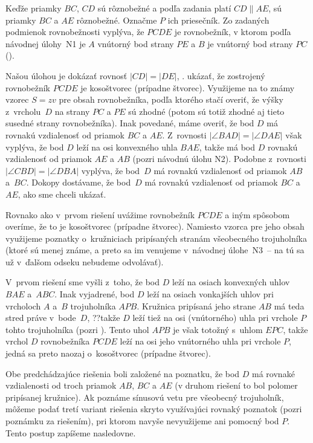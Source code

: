 {%
Keďže priamky $BC$, $CD$ sú rôznobežné a podľa zadania platí
$CD \parallel AE$, sú priamky $BC$ a $AE$ rôznobežné. Označme $P$
ich priesečník. Zo zadaných podmienok rovnobežnosti vyplýva, že
$PCDE$ je rovnobežník, v ktorom podľa návodnej úlohy~N1 je $A$
vnútorný bod strany $PE$ a $B$ je vnútorný bod strany $PC$ (\obr).
%

Našou úlohou je dokázať rovnosť $|CD|=|DE|$, \tj. ukázať, že
zostrojený rovnobežník $PCDE$ je kosoštvorec (prípadne štvorec).
Využijeme na to známy vzorec $S=zv$ pre obsah rovnobežníka,
podľa ktorého stačí overiť, že výšky z~vrcholu~$D$ na strany $PC$
a $PE$ sú zhodné (potom sú totiž zhodné aj tieto susedné
strany rovnobežníka). Inak povedané, máme overiť, že bod $D$ má
rovnakú vzdialenosť od priamok $BC$ a $AE$. Z~rovnosti
$|\angle BAD|=|\angle DAE|$ však vyplýva, že bod $D$ leží na osi
konvexného uhla $BAE$, takže má bod $D$ rovnakú vzdialenosť od priamok
$AE$ a $AB$ (pozri návodnú úlohu N2). Podobne z~rovnosti
$|\angle CBD|=|\angle DBA|$ vyplýva, že bod~$D$ má rovnakú
vzdialenosť od priamok $AB$ a~$BC$. Dokopy dostávame, že
bod~$D$ má rovnakú vzdialenosť od priamok $BC$ a $AE$, ako sme
chceli ukázať.

\ineriesenie
Rovnako ako v~prvom riešení uvážime rovnobežník $PCDE$ a iným
spôsobom overíme, že to je kosoštvorec (prípadne štvorec). Namiesto
vzorca pre jeho obsah využijeme poznatky
o~kružniciach pripísaných stranám všeobecného trojuholníka (ktoré sú menej
známe, a preto sa im venujeme v~návodnej úlohe~N3~-- na tú sa
už v~ďalšom odseku nebudeme odvolávať).
%

V~prvom riešení sme vyšli z~toho, že bod $D$ leží
na osiach konvexných uhlov $BAE$ a~$ABC$. Inak vyjadrené, bod $D$
leží na osiach vonkajších uhlov pri vrcholoch $A$ a~$B$ trojuholníka $APB$. Kružnica
pripísaná jeho strane $AB$ má teda stred práve v~bode~$D$, ??takže $D$ leží tiež na osi (vnútorného) uhla pri vrchole $P$
tohto trojuholníka (pozri \obr{}).
Tento uhol $APB$ je však totožný s~uhlom $EPC$,
takže vrchol $D$ rovnobežníka $PCDE$ leží na osi jeho
vnútorného uhla pri vrchole $P$, jedná sa preto naozaj
o~kosoštvorec (prípadne štvorec).

\ineriesenie
Obe predchádzajúce riešenia boli založené na poznatku, že bod $D$ má
rovnaké vzdialenosti od troch priamok $AB$, $BC$ a $AE$ (v druhom
riešení to bol polomer pripísanej kružnice). Ak poznáme sínusovú vetu
pre všeobecný trojuholník, môžeme podať tretí variant riešenia
skryto využívajúci rovnaký poznatok
(pozri poznámku za riešením), pri ktorom navyše nevyužijeme
ani pomocný bod $P$. Tento postup zapíšeme nasledovne.

}
